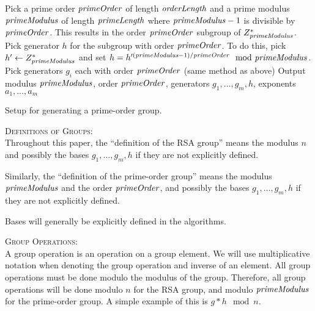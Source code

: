 \begin{algorithm}[H]\label{setupPrime}
\dontprintsemicolon

\BlankLine

 \;
\Indp
  Pick a prime order $\mathit{primeOrder}$ of length $\mathit{orderLength}$ and a prime modulus $\mathit{primeModulus}$ of length $\mathit{primeLength}$ where $\mathit{primeModulus}-1$ is divisible by $\mathit{primeOrder}$. This results in the order $\mathit{primeOrder}$ subgroup of $Z_{\mathit{primeModulus}}^*$. \;
  Pick generator $h$ for the subgroup with order $\mathit{primeOrder}$.  To do this, pick $h' \leftarrow Z_{\mathit{primeModulus}}^*$ and set $h =  h'^{(\mathit{primeModulus} - 1) / \mathit{primeOrder}} \mod {\mathit{primeModulus}} $. \;
    {Pick generators $g_i$ each with order $\mathit{primeOrder}$ (same method as above)\;}
  Output modulus $\mathit{primeModulus}$, order $\mathit{primeOrder}$, generators $g_1,\ldots,g_m,h$, exponents $a_1,\ldots,a_m$ \;
\Indm

\caption{Setup for generating a prime-order group.}
\end{algorithm}


\textsc{Definitions of Groups}:\\
Throughout this paper, the ``definition of the RSA group'' means the modulus $n$ and possibly the bases $g_1,\ldots,g_m,h$ if they are not explicitly defined.

Similarly, the ``definition of the prime-order group'' means the modulus $\mathit{primeModulus}$ and the order $\mathit{primeOrder}$, and possibly the bases $g_1,\ldots,g_m,h$ if they are not explicitly defined.

Bases will generally be explicitly defined in the algorithms.


\textsc{Group Operations}:\\
A group operation is an operation on a group element. We will use multiplicative notation when denoting the group operation and inverse of an element. All group operations must be done modulo the modulus of the group. Therefore, all group operations will be done modulo $n$ for the RSA group, and modulo $\mathit{primeModulus}$ for the prime-order group. A simple example of this is $g*h \mod n$.




